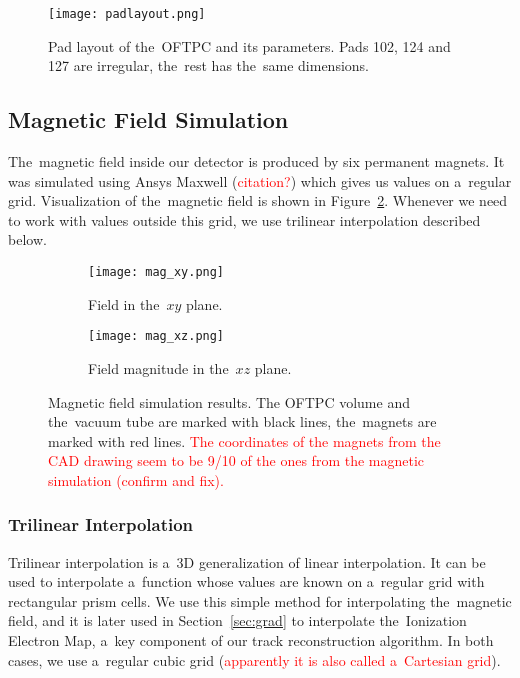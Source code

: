 				\begin{figure}[H]
					\centering
					\texttt{[image: padlayout.png]}
					\caption{Pad layout of the~\ac{OFTPC} and its parameters. Pads 102, 124 and 127 are irregular, the~rest has the~same dimensions.}
					\label{fig:padlayout}
				\end{figure}
		
		\subsection{Magnetic Field Simulation}
		\label{sec:mag}
			The~magnetic field inside our detector is produced by six permanent magnets. It was simulated using Ansys Maxwell (\textcolor{red}{citation?}) which gives us values on a~regular grid. Visualization of the~magnetic field is shown in Figure~\ref{fig:mag}. Whenever we need to work with values outside this grid, we use trilinear interpolation described below.
			
			\begin{figure}
				\centering
				\begin{subfigure}[t]{0.45\textwidth}
					\centering
					\texttt{[image: mag\_xy.png]}
					\caption{Field in the~$xy$ plane.}
				\end{subfigure}
				\hfill
				\begin{subfigure}[t]{0.45\textwidth}
					\centering
					\texttt{[image: mag\_xz.png]}
					\caption{Field magnitude in the~$xz$ plane.}
				\end{subfigure}
				\caption{Magnetic field simulation results. The \ac{OFTPC} volume and the~vacuum tube are marked with black lines, the~magnets are marked with red lines. \textcolor{red}{The coordinates of the magnets from the CAD drawing seem to be 9/10 of the ones from the magnetic simulation (confirm and fix).}}
				\label{fig:mag}
			\end{figure}
		
			\subsubsection{Trilinear Interpolation}
			\label{sec:trilin}
				Trilinear interpolation is a~3D generalization of linear interpolation. It can be used to interpolate a~function whose values are known on a~regular grid with rectangular prism cells. We use this simple method for interpolating the~magnetic field, and it is later used in Section~\ref{sec:grad} to interpolate the~Ionization Electron Map, a~key component of our track reconstruction algorithm. In both cases, we use a~regular cubic grid (\textcolor{red}{apparently it is also called a~Cartesian grid}).
				
